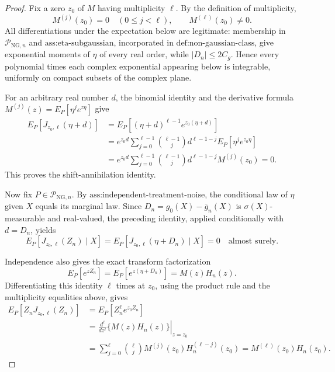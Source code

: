 \begin{proof}
Fix a zero \(z_0\) of \(M\) having multiplicity \(\ell\).  By the definition of multiplicity,
\[
 M^{(j)}(z_0)=0\quad(0\le j<\ell),
 \qquad M^{(\ell)}(z_0)\ne0.
\]
All differentiations under the expectation below are legitimate: membership in \(\mathcal P_{\mathrm{NG},n}\) and \(\text{ass:eta-subgaussian}\), incorporated in \(\text{def:non-gaussian-class}\), give exponential moments of \(\eta\) of every real order, while \(|D_n|\le 2C_g\).  Hence every polynomial times each complex exponential appearing below is integrable, uniformly on compact subsets of the complex plane.

For an arbitrary real number \(d\), the binomial identity and the derivative formula \(M^{(j)}(z)=E_P[\eta^j e^{z\eta}]\) give
\[
\begin{aligned}
 E_P[J_{z_0,\ell}(\eta+d)]
 &=E_P[(\eta+d)^{\ell-1}e^{z_0(\eta+d)}]\\
 &=e^{z_0d}\sum_{j=0}^{\ell-1}
   {\ell-1\choose j}d^{\ell-1-j}E_P[\eta^j e^{z_0\eta}]\\
 &=e^{z_0d}\sum_{j=0}^{\ell-1}
   {\ell-1\choose j}d^{\ell-1-j}M^{(j)}(z_0)=0.
\end{aligned}
\]
This proves the shift-annihilation identity.

Now fix \(P\in\mathcal P_{\mathrm{NG},n}\).  By \(\text{ass:independent-treatment-noise}\), the conditional law of \(\eta\) given \(X\) equals its marginal law.  Since \(D_n=g_0(X)-\bar g_n(X)\) is \(\sigma(X)\)-measurable and real-valued, the preceding identity, applied conditionally with \(d=D_n\), yields
\[
 E_P[J_{z_0,\ell}(Z_n)\mid X]
 =E_P[J_{z_0,\ell}(\eta+D_n)\mid X]=0
 \quad\text{almost surely}.
\]

Independence also gives the exact transform factorization
\[
 E_P[e^{zZ_n}]
 =E_P[e^{z(\eta+D_n)}]=M(z)H_n(z).
\]
Differentiating this identity \(\ell\) times at \(z_0\), using the product rule and the multiplicity equalities above, gives
\[
\begin{aligned}
 E_P[Z_nJ_{z_0,\ell}(Z_n)]
 &=E_P[Z_n^{\ell}e^{z_0Z_n}]\\
 &=\left.\frac{d^{\ell}}{dz^{\ell}}\{M(z)H_n(z)\}\right|_{z=z_0}\\
 &=\sum_{j=0}^{\ell}{\ell\choose j}
   M^{(j)}(z_0)H_n^{(\ell-j)}(z_0)
 =M^{(\ell)}(z_0)H_n(z_0).
\end{aligned}
\]


\end{proof}
